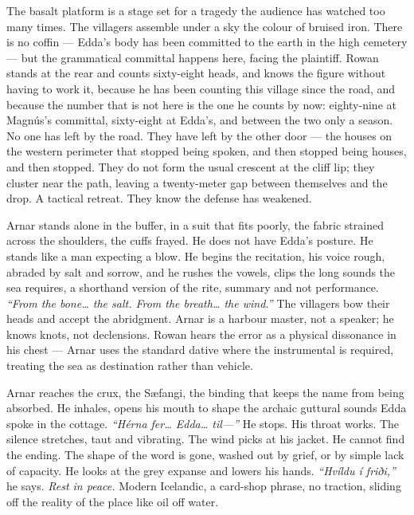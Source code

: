 \documentclass[11pt,oneside]{book}
\newcommand{\sceneline}{%
  \par\vspace{1.2em}
  \begin{center}
    \fontsize{11}{11}\selectfont \textbullet\quad\textbullet\quad\textbullet
  \end{center}
  \vspace{0.6em}\noindent\ignorespaces
}
\begin{document}
\sceneline

The basalt platform is a stage set for a tragedy the audience has
watched too many times. The villagers assemble under a sky the colour of
bruised iron. There is no coffin --- Edda's body has been committed to
the earth in the high cemetery --- but the grammatical committal happens
here, facing the plaintiff. Rowan stands at the rear and counts
sixty-eight heads, and knows the figure without having to work it,
because he has been counting this village since the road, and because
the number that is not here is the one he counts by now: eighty-nine at
Magnús's committal, sixty-eight at Edda's, and between the two only a
season. No one has left by the road. They have left by the other
door --- the houses on the western perimeter that stopped being spoken,
and then stopped being houses, and then stopped. They do not form the
usual crescent at the cliff lip;
they cluster near the path, leaving a twenty-meter gap between
themselves and the drop. A tactical retreat. They know the defense has
weakened.

Arnar stands alone in the buffer, in a suit that fits poorly, the fabric
strained across the shoulders, the cuffs frayed. He does not have Edda's
posture. He stands like a man expecting a blow. He begins the
recitation, his voice rough, abraded by salt and sorrow, and he rushes
the vowels, clips the long sounds the sea requires, a shorthand version
of the rite, summary and not performance. \emph{``From the bone\ldots{}
the salt. From the breath\ldots{} the wind.''} The villagers bow their
heads and accept the abridgment. Arnar is a harbour master, not a
speaker; he knows knots, not declensions. Rowan hears the error as a
physical dissonance in his chest --- Arnar uses the standard dative
where the instrumental is required, treating the sea as destination
rather than vehicle.

Arnar reaches the crux, the Sæfangi, the binding that keeps the name
from being absorbed. He inhales, opens his mouth to shape the archaic
guttural sounds Edda spoke in the cottage. \emph{``Hérna fer\ldots{}
Edda\ldots{} til---''} He stops. His throat works. The silence
stretches, taut and vibrating. The wind picks at his jacket. He cannot
find the ending. The shape of the word is gone, washed out by grief, or
by simple lack of capacity. He looks at the grey expanse and lowers his
hands. \emph{``Hvíldu í friði,''} he says. \emph{Rest in peace.} Modern
Icelandic, a card-shop phrase, no traction, sliding off the reality of
the place like oil off water.
\end{document}
